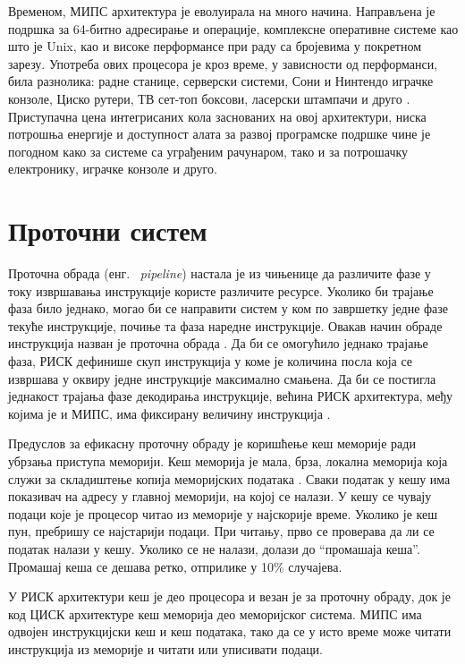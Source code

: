 \documentclass[12pt,oneside]{memoir}
\begin{document}
Временом, МИПС архитектура је еволуирала на много начина. Направљена је подршка за 64-битно адресирање и операције, комплексне оперативне системе као што је Unix, као и високе перформансе при раду са бројевима у покретном зарезу. Употреба ових процесора је кроз време, у зависности од перформанси, била разнолика: радне станице, серверски системи, Сони и Нинтендо играчке конзоле, Циско рутери, ТВ сет-топ боксови, ласерски штампачи и друго \cite{mips}.
Приступачна цена интегрисаних кола заснованих на овој архитектури, ниска потрошња енергије и доступност алата за развој програмске подршке чине је погодном како за системе са уграђеним рачунаром, тако и за потрошачку електронику, играчке конзоле и друго.


\section{Проточни систем }
\label{sec:pipeline}
Проточна обрада (енг. ~\textit{pipeline}) настала је из чињенице да различите фазе у току извршавања инструкције користе различите ресурсе. Уколико би трајање фаза било једнако, могао би се направити систем у ком по завршетку једне фазе текуће инструкције, почиње та фаза наредне инструкције. Овакав начин обраде инструкција назван је проточна обрада \cite{mips}. Да би се омогућило једнако трајање фаза, РИСК дефинише скуп инструкција у коме је количина посла која се извршава у оквиру једне инструкције максимално смањена. Да би се постигла једнакост трајања фазе декодирања инструкције, већина РИСК архитектура, међу којима је и МИПС, има фиксирану величину инструкција \cite{mips}.

Предуслов за ефикасну проточну обраду је коришћење кеш меморије ради убрзања приступа меморији. Кеш меморија је мала, брза, локална меморија која служи за складиштење копија меморијских података \cite{mips}. Сваки податак у кешу има показивач на адресу у главној меморији, на којој се налази. У кешу се чувају подаци које је процесор читао из меморије у најскорије време. Уколико је кеш пун, пребришу се најстарији подаци. При читању, прво се проверава да ли се податак налази у кешу. Уколико се не налази, долази до “промашаја кеша”. Промашај кеша се дешава ретко, отприлике у 10\% случајева.

У РИСК архитектури кеш је део процесора и везан је за проточну обраду, док је код ЦИСК архитектуре кеш меморија део меморијског система. МИПС има одвојен инструкцијски кеш и кеш података, тако да се у исто време може читати инструкција из меморије и читати или уписивати подаци. 
\end{document}
